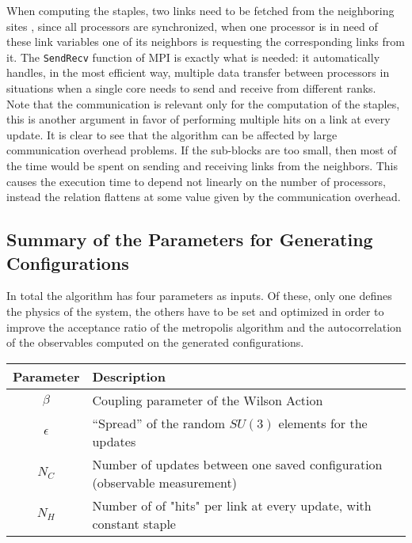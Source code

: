 When computing the staples, two links need to be fetched from the neighboring sites , since all processors are synchronized, when one processor is in need of these link variables one of its neighbors is requesting the corresponding links from it. The \texttt{SendRecv} function of MPI is exactly what is needed: it automatically handles, in the most efficient way, multiple data transfer between processors in situations when a single core needs to send and receive from different ranks. \\ 
Note that the communication is relevant only for the computation of the staples, this is another argument in favor of performing multiple hits on a link at every update. It is clear to see that the algorithm can be affected by large communication overhead problems. If the sub-blocks are too small, then most of the time would be spent on sending and receiving links from the neighbors. This causes the execution time to depend not linearly on the number of processors, instead the relation flattens at some value given by the communication overhead.

\subsection{Summary of the Parameters for Generating Configurations}
In total the algorithm has four parameters as inputs. Of these, only one defines the physics of the system, the others have to be set and optimized in order to improve the acceptance ratio of the metropolis algorithm and the autocorrelation of the observables computed on the generated configurations.

\begin{table}[!htb]
\begin{center}
\begin{tabular}{cl}
    Parameter & Description\\\hline
    $\beta$ & Coupling parameter of the Wilson Action\\
    $\epsilon$ & ``Spread'' of the random $SU(3)$ elements for the updates\\
    $N_C$ & Number of updates between one saved configuration (observable measurement)\\
    $N_H$ & Number of of "hits" per link at every update, with constant staple 
\end{tabular}
\label{MC:params}
\end{center}
\end{table}

